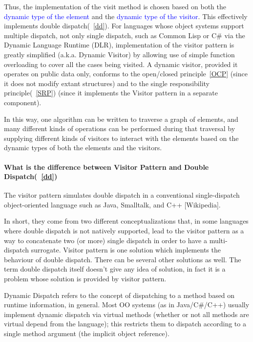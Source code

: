\documentclass{book}
\begin{document}
Thus, the implementation of the visit method is chosen based on both the \textcolor{blue}{dynamic type of the element} and the \textcolor{blue}{dynamic type of the visitor}.
This effectively implements double dispatch(~\ref{dd}). For languages whose object systems support multiple dispatch,
not only single dispatch, such as Common Lisp or C\# via the Dynamic Language Runtime (DLR), 
implementation of the visitor pattern is greatly simplified (a.k.a. Dynamic Visitor) by allowing use of simple function overloading to cover all the cases being visited.
A dynamic visitor, provided it operates on public data only, conforms to the open/closed principle~\ref{OCP} (since it does not modify extant structures)
and to the single responsibility principle(~\ref{SRP}) (since it implements the Visitor pattern in a separate component).

In this way, one algorithm can be written to traverse a graph of elements, 
and many different kinds of operations can be performed during that traversal by supplying different kinds of visitors to 
interact with the elements based on the dynamic types of both the elements and the visitors.

\paragraph{What is the difference between Visitor Pattern and Double Dispatch(~\ref{dd})}%
The visitor pattern simulates double dispatch in a conventional single-dispatch object-oriented language such as Java, Smalltalk, and C++ [Wikipedia].

In short, they come from two different conceptualizations that, in some languages where double dispatch is not natively supported,
lead to the visitor pattern as a way to concatenate two (or more) single dispatch in order to have a multi-dispatch surrogate.
Visitor pattern is one solution which implements the behaviour of double dispatch.
There can be several other solutions as well.
The term double dispatch itself doesn't give any idea of solution, in fact it is a problem whose solution is provided by visitor pattern.

Dynamic Dispatch refers to the concept of dispatching to a method based on runtime information, in general.
Most OO systems (as in Java/C\#/C++) usually implement dynamic dispatch via virtual methods (whether or not all methods are virtual depend from the language);
this restricts them to dispatch according to a single method argument (the implicit object reference).
\end{document}
